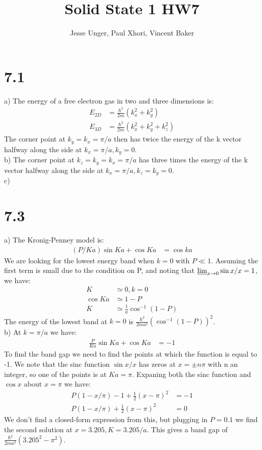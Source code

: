 \documentclass[a4paper,11pt]{article}
\title{Solid State 1 HW7}
\author{Jesse Unger, Paul Xhori, Vincent Baker}
\numberwithin{equation}{section}
\newcommand{\lrp}[1]{\left({#1}\right)}
\begin{document}
\maketitle

\section*{7.1}
a) The energy of a free electron gas in two and three dimensions is:
\begin{align}
 E_{2D} &= \frac{\hbar^2}{2m}\lrp{k_x^2+k_y^2}\\
 E_{3D} &= \frac{\hbar^2}{2m}\lrp{k_x^2+k_y^2+k_z^2}
\end{align}
The corner point at $k_y=k_x=\pi/a$ then has twice the energy of the k vector halfway along the side at $k_x=\pi/a, k_y=0$.\\
b) The corner point at $k_z=k_y=k_x=\pi/a$ has three times the energy of the k vector halfway along the side at $k_x=\pi/a, k_z=k_y=0$.\\
c)
\section*{7.3}
a) The Kronig-Penney model is:
\begin{align}
 (P/Ka)\sin{Ka} + \cos{Ka} &= \cos{ka}
\end{align}
We are looking for the lowest energy band when $k=0$ with $P \ll 1$.
Assuming the first term is small due to the condition on P, and noting that $\varliminf_{x\rightarrow 0}\sin{x}/x = 1$, we have:
\begin{align}
 K &\simeq 0,k=0\\
 \cos{Ka} &\simeq 1-P\\
 K &\simeq \frac{1}{a} \cos^{-1}{(1-P)}
\end{align}
The energy of the lowest band at $k=0$ is $\frac{\hbar^2}{2ma^2}\lrp{\cos^{-1}{(1-P)}}^2$.\\
b) At $k=\pi/a$ we have:
\begin{align}
 \frac{P}{Ka}\sin{Ka}+\cos{Ka} &= -1
\end{align}
To find the band gap we need to find the points at which the function is equal to -1.
We note that the sinc function $\sin{x}/x$ has zeros at $x=\pm n\pi$ with n an integer, so one of the points is at $Ka=\pi$.
Expaning both the sinc function and $\cos{x}$ about $x=\pi$ we have:
\begin{align}
 P(1-x/\pi)-1+\frac{1}{2}\lrp{x-\pi}^2 &= -1\\
 P(1-x/\pi)+\frac{1}{2}\lrp{x-\pi}^2 &= 0
\end{align}
We don't find a closed-form expression from this, but plugging in $P=0.1$ we find the second solution at $x=3.205, K=3.205/a$.
This gives a band gap of $\frac{\hbar^2}{2ma^2}(3.205^2-\pi^2)$.
 
\end{document}
